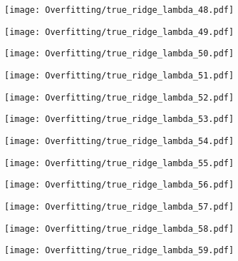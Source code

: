 \documentclass[xcolor=pdftex,dvipsnames,table]{beamer}
\begin{document}
\frame
{
	\begin{center}
		\texttt{[image: Overfitting/true\_ridge\_lambda\_48.pdf]}
	\end{center}
}

\frame
{
	\begin{center}
		\texttt{[image: Overfitting/true\_ridge\_lambda\_49.pdf]}
	\end{center}
}

\frame
{
	\begin{center}
		\texttt{[image: Overfitting/true\_ridge\_lambda\_50.pdf]}
	\end{center}
}

\frame
{
	\begin{center}
		\texttt{[image: Overfitting/true\_ridge\_lambda\_51.pdf]}
	\end{center}
}

\frame
{
	\begin{center}
		\texttt{[image: Overfitting/true\_ridge\_lambda\_52.pdf]}
	\end{center}
}

\frame
{
	\begin{center}
		\texttt{[image: Overfitting/true\_ridge\_lambda\_53.pdf]}
	\end{center}
}

\frame
{
	\begin{center}
		\texttt{[image: Overfitting/true\_ridge\_lambda\_54.pdf]}
	\end{center}
}

\frame
{
	\begin{center}
		\texttt{[image: Overfitting/true\_ridge\_lambda\_55.pdf]}
	\end{center}
}

\frame
{
	\begin{center}
		\texttt{[image: Overfitting/true\_ridge\_lambda\_56.pdf]}
	\end{center}
}

\frame
{
	\begin{center}
		\texttt{[image: Overfitting/true\_ridge\_lambda\_57.pdf]}
	\end{center}
}

\frame
{
	\begin{center}
		\texttt{[image: Overfitting/true\_ridge\_lambda\_58.pdf]}
	\end{center}
}

\frame
{
	\begin{center}
		\texttt{[image: Overfitting/true\_ridge\_lambda\_59.pdf]}
	\end{center}
}
\end{document}
